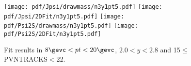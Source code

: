 \begin{figure}[H]
\begin{center}
\texttt{[image: pdf/Jpsi/drawmass/n3y1pt5.pdf]}
\texttt{[image: pdf/Jpsi/2DFit/n3y1pt5.pdf]}
\vspace*{-0.5cm}
\texttt{[image: pdf/Psi2S/drawmass/n3y1pt5.pdf]}
\texttt{[image: pdf/Psi2S/2DFit/n3y1pt5.pdf]}
\vspace*{-0.5cm}
\end{center}
\caption{Fit results in $8\gevc<pt<20\gevc$, $2.0<y<2.8$ and 15$\leq$PVNTRACKS$<$22.}
\label{Fitn3y1pt5}
\end{figure}
